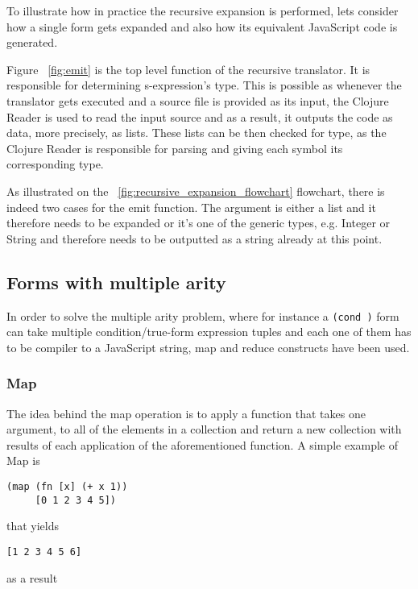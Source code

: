 

To illustrate how in practice the recursive expansion is performed, lets consider how a single form gets expanded and also how its equivalent JavaScript code is generated. 



Figure ~\ref{fig:emit} is the top level function of the recursive translator. It is responsible for determining s-expression's type. This is possible as whenever the translator gets executed and a source file is provided as its input, the Clojure Reader is used to read the input source and as a result, it outputs the code as data, more precisely, as lists. 
These lists can be then checked for type, as the Clojure Reader is responsible for parsing and giving each symbol its corresponding type.

As illustrated on the ~\ref{fig:recursive_expansion_flowchart} flowchart, there is indeed two cases for the emit function. The argument is either a list and it therefore needs to be expanded or it's one of the generic types, e.g. Integer or String and therefore needs to be outputted as a string already at this point. 

\subsection{Forms with multiple arity}

In order to solve the multiple arity problem, where for instance a \texttt{(cond )} form can take multiple condition/true-form expression tuples and each one of them has to be compiler to a JavaScript string, map and reduce constructs have been used. 

\subsubsection{Map}
The idea behind the map operation is to apply a function that takes one argument, to all of the elements in a collection and return a new collection with results of each application of the aforementioned function. 
A simple example of Map is 

\begin{verbatim}
(map (fn [x] (+ x 1)) 
	 [0 1 2 3 4 5])
\end{verbatim}
that yields 
\begin{verbatim}
[1 2 3 4 5 6]
\end{verbatim}
as a result

